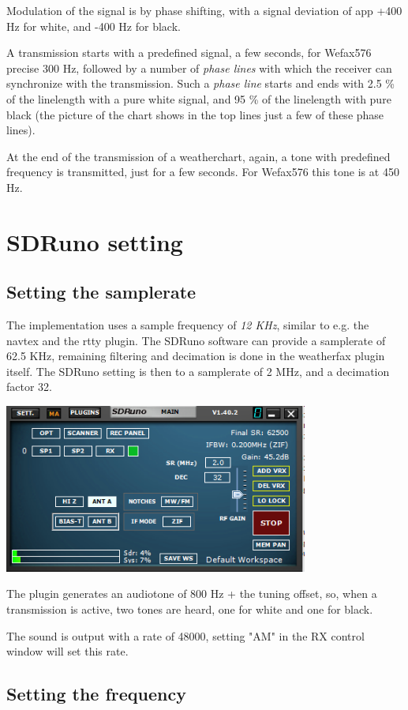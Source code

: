 \documentclass[11pt]{article}
\begin{document}
Modulation of the signal is by phase shifting, with a signal deviation of
app  +400 Hz for white, and -400 Hz for black.

A transmission starts with a predefined signal, a few seconds, for Wefax576
precise 300 Hz,
followed by a number of {\em phase lines} with which the receiver can synchronize
with the transmission.
Such a {\em phase line} starts and ends with 2.5 \% of the linelength
with a pure white signal, and 95 \% of the linelength with pure black
(the picture of the chart shows in the top lines just a few of these
phase lines).

At the end of the transmission of a weatherchart, again, a tone
with predefined frequency is transmitted, just for a few seconds.
For Wefax576 this tone is at 450 Hz.

\section{SDRuno setting}
\subsection{Setting the samplerate}
The implementation uses a sample frequency of {\em 12 KHz},
similar to e.g. the navtex and the rtty plugin.
The SDRuno software can provide a samplerate
of 62.5 KHz, remaining filtering and decimation is done in
the weatherfax plugin itself.
The SDRuno setting is then to a samplerate of 2 MHz, and a decimation factor
32.

\includegraphics[width=100mm]{main-widget.png}

The plugin generates an audiotone of 800 Hz + the tuning offset,
so, when a transmission is active, two tones are heard, one for
white and one for black.

The sound is output with a rate of 48000, setting "AM" in the RX control window
will set this rate.

\subsection{Setting the frequency}
\end{document}
